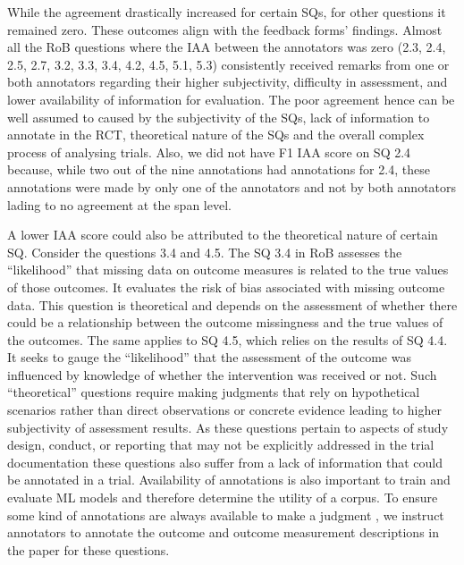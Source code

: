 \documentclass[sn-mathphys,Numbered]{sn-jnl}%
\theoremstyle{thmstyleone}%
\theoremstyle{thmstyletwo}%
\theoremstyle{thmstylethree}%
\begin{document}
While the agreement drastically increased for certain SQs, for other questions it remained zero.
These outcomes align with the feedback forms' findings.
Almost all the RoB questions where the IAA between the annotators was zero (2.3, 2.4, 2.5, 2.7, 3.2, 3.3, 3.4, 4.2, 4.5, 5.1, 5.3) consistently received remarks from one or both annotators regarding their higher subjectivity, difficulty in assessment, and lower availability of information for evaluation.
The poor agreement hence can be well assumed to caused by the subjectivity of the SQs, lack of information to annotate in the RCT, theoretical nature of the SQs and the overall complex process of analysing trials.
Also, we did not have F1 IAA score on SQ 2.4 because, while two out of the nine annotations had annotations for 2.4, these annotations were made by only one of the annotators and not by both annotators lading to no agreement at the span level.


A lower IAA score could also be attributed to the theoretical nature of certain SQ.
Consider the questions 3.4 and 4.5.
The SQ 3.4 in RoB assesses the ``likelihood'' that missing data on outcome measures is related to the true values of those outcomes. 
It evaluates the risk of bias associated with missing outcome data.
This question is theoretical and depends on the assessment of whether there could be a relationship between the outcome missingness and the true values of the outcomes.
The same applies to SQ 4.5, which relies on the results of SQ 4.4.
It seeks to gauge the ``likelihood'' that the assessment of the outcome was influenced by knowledge of whether the intervention was received or not.
Such ``theoretical'' questions require making judgments that rely on hypothetical scenarios rather than direct observations or concrete evidence leading to higher subjectivity of assessment results.
As these questions pertain to aspects of study design, conduct, or reporting that may not be explicitly addressed in the trial documentation these questions also suffer from a lack of information that could be annotated in a trial.
Availability of annotations is also important to train and evaluate ML models and therefore determine the utility of a corpus.
To ensure some kind of annotations are always available to make a judgment , we instruct annotators to annotate the outcome and outcome measurement descriptions in the paper for these questions.
\end{document}
